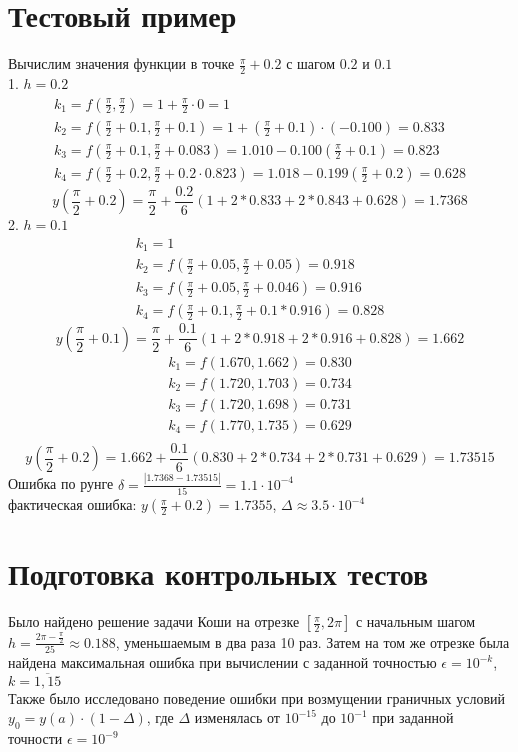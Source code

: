 \documentclass[a4paper]{article}
\begin{document}
\section{Тестовый пример}\label{sec:S5}
Вычислим значения функции в точке \(\frac{\pi}{2}+0.2\) с шагом \(0.2\) и \(0.1\)\\
1. \(h = 0.2\)\[
\begin{matrix}
  k_1 = f(\frac{\pi}{2},\frac{\pi}{2}) = 1 + \frac{\pi}{2} \cdot 0 = 1\\
  k_2 = f(\frac{\pi}{2} + 0.1, \frac{\pi}{2} + 0.1) = 1 + (\frac{\pi}{2} + 0.1)\cdot(-0.100) = 0.833\\
  k_3 = f(\frac{\pi}{2} + 0.1, \frac{\pi}{2} + 0.083) = 1.010 -0.100 (\frac{\pi}{2} + 0.1) = 0.823\\
  k_4 = f(\frac{\pi}{2} + 0.2, \frac{\pi}{2} + 0.2\cdot0.823) = 1.018 -0.199(\frac{\pi}{2}+0.2) = 0.628
   \end{matrix}
 \]\[
   y(\frac{\pi}{2}+0.2) = \frac{\pi}{2} + \frac{0.2}{6}(1 + 2*0.833 + 2*0.843 + 0.628) = 1.7368
 \]
 2. \(h = 0.1\) \[
   \begin{matrix}
     k_1 = 1\\
     k_2 = f(\frac{\pi}{2} + 0.05, \frac{\pi}{2} + 0.05) = 0.918\\
     k_3 = f(\frac{\pi}{2} + 0.05, \frac{\pi}{2} + 0.046) = 0.916\\
     k_4 = f(\frac{\pi}{2} + 0.1,\frac{\pi}{2} + 0.1*0.916) = 0.828
   \end{matrix}
 \]\[
   y(\frac{\pi}{2} + 0.1) = \frac{\pi}{2} + \frac{0.1}{6}(1 + 2*0.918 + 2*0.916 + 0.828) = 1.662
 \]\[
   \begin{matrix}
     k_1 = f(1.670,1.662) = 0.830\\
     k_2 = f(1.720,1.703) = 0.734\\
     k_3 = f(1.720,1.698) = 0.731\\
     k_4 = f(1.770,1.735) = 0.629\\
   \end{matrix}
 \]\[
   y(\frac{\pi}{2} + 0.2) = 1.662 + \frac{0.1}{6}(0.830+2*0.734+2*0.731+0.629) = 1.73515
 \]
 Ошибка по рунге \(\delta = \frac{|1.7368 - 1.73515|}{15} = 1.1\cdot10^{-4}\)\\
 фактическая ошибка: \(y(\frac{\pi}{2}+0.2) = 1.7355\), \(\Delta \approx 3.5\cdot10^{-4}\)

 \section{Подготовка контрольных тестов}\label{sec:S6}
 Было найдено решение задачи Коши на отрезке \([\frac{\pi}{2},2\pi]\) с начальным шагом \(h = \frac{2\pi-\frac{\pi}{2}}{25} \approx 0.188\),
 уменьшаемым в два раза 10 раз.
 Затем на том же отрезке была найдена максимальная ошибка при вычислении с заданной точностью \(\epsilon = 10^{-k}\),
 \(k = \overline{1,15}\)\\
 Также было исследовано поведение ошибки при возмущении граничных условий \(y_{0}=y(a)\cdot(1-\Delta)\), где \(\Delta\) изменялась от
 \(10^{-15}\) до \(10^{-1}\) при заданной точности \(\epsilon = 10^{-9}\)
\end{document}
